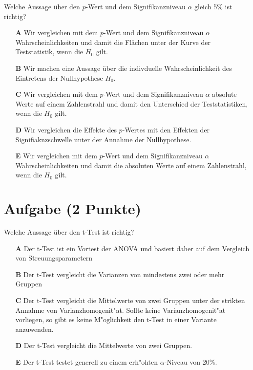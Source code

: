 \documentclass[a4paper, 10pt]{scrartcl}\usepackage[]{graphicx}\usepackage[]{xcolor}
\begin{document}
Welche Aussage über den $p$-Wert und dem Signifikanzniveau $\alpha$ gleich 5\% ist richtig?



\begin{enumerate}
\item [\textbf{A} \msquare] Wir vergleichen mit dem $p$-Wert und dem Signifikanzniveau $\alpha$ Wahrscheinlichkeiten und damit die Flächen unter der Kurve der Teststatistik, wenn die $H_0$ gilt.
\item [\textbf{B} \msquare] Wir machen eine Aussage über die indivduelle Wahrscheinlichkeit des Eintretens der Nullhypothese $H_0$.
\item [\textbf{C} \msquare] Wir vergleichen mit dem $p$-Wert und dem Signifikanzniveau $\alpha$ absolute Werte auf einem Zahlenstrahl und damit den Unterschied der Teststatistiken, wenn die $H_0$ gilt.
\item [\textbf{D} \msquare] Wir vergleichen die Effekte des $p$-Wertes mit den Effekten der Signifiaknzschwelle unter der Annahme der Nullhypothese.
\item [\textbf{E} \msquare] Wir vergleichen mit dem $p$-Wert und dem Signifikanzniveau $\alpha$ Wahrscheinlichkeiten und damit die absoluten Werte auf einem Zahlenstrahl, wenn die $H_0$ gilt.
\end{enumerate}

\section{Aufgabe \hfill (2 Punkte)}

Welche Aussage {\"u}ber den t-Test ist richtig?



\begin{enumerate}
\item [\textbf{A} \msquare] Der t-Test ist ein Vortest der ANOVA und basiert daher auf dem Vergleich von Streuungsparametern
\item [\textbf{B} \msquare] Der t-Test vergleicht die Varianzen von mindestens zwei oder mehr Gruppen
\item [\textbf{C} \msquare] Der t-Test vergleicht die Mittelwerte von zwei Gruppen unter der strikten Annahme von Varianzhomogenit{"a}t. Sollte keine Varianzhomogenit{"a}t vorliegen, so gibt es keine M{"o}glichkeit den t-Test in einer Variante anzuwenden.
\item [\textbf{D} \msquare] Der t-Test vergleicht die Mittelwerte von zwei Gruppen.
\item [\textbf{E} \msquare] Der t-Test testet generell zu einem erh{"o}hten $\alpha$-Niveau von 20\%.
\end{enumerate}    
\end{document}
